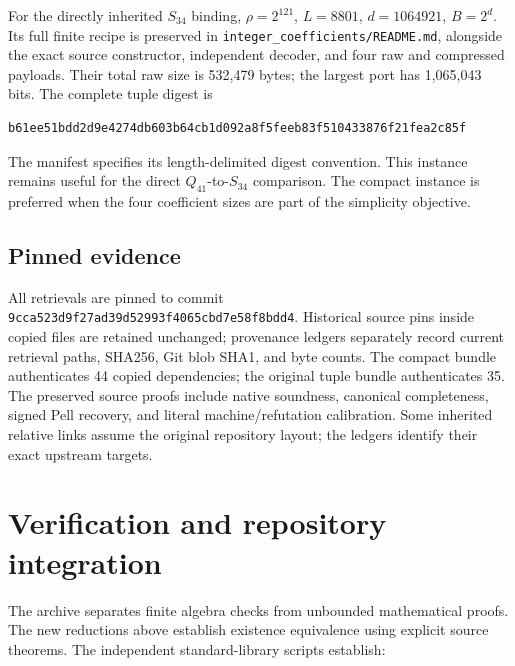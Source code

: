 \documentclass[11pt,a4paper]{article}
\theoremstyle{definition}
\newcommand{\src}[1]{{\urlstyle{tt}\nolinkurl{#1}}}
\begin{document}
For the directly inherited \(S_{34}\) binding,
\(\rho=2^{121}\), \(L=8801\), \(d=1064921\), \(B=2^d\).
Its full finite recipe is preserved in
\src{integer_coefficients/README.md}, alongside the exact
source constructor, independent decoder, and four raw and
compressed payloads. Their total raw size is 532,479 bytes;
the largest port has 1,065,043 bits. The complete tuple digest is
\begin{lstlisting}
b61ee51bdd2d9e4274db603b64cb1d092a8f5feeb83f510433876f21fea2c85f
\end{lstlisting}
The manifest specifies its length-delimited digest convention.
This instance remains useful for the direct
\(Q_{41}\)-to-\(S_{34}\) comparison. The compact instance is
preferred when the four coefficient sizes are part of the
simplicity objective.

\subsection{Pinned evidence}

All retrievals are pinned to commit
\src{9cca523d9f27ad39d52993f4065cbd7e58f8bdd4}.
Historical source pins inside copied files are retained
unchanged; provenance ledgers separately record current
retrieval paths, SHA256, Git blob SHA1, and byte counts.
The compact bundle authenticates 44 copied dependencies;
the original tuple bundle authenticates 35.
The preserved source proofs include native soundness,
canonical completeness, signed Pell recovery, and literal
machine/refutation calibration. Some inherited relative links
assume the original repository layout; the ledgers identify
their exact upstream targets.

\section{Verification and repository integration}
\label{sec:verification}

The archive separates finite algebra checks from unbounded
mathematical proofs. The new reductions above establish
existence equivalence using explicit source theorems.
The independent standard-library scripts establish:
\end{document}
